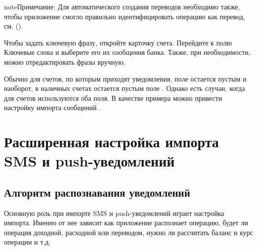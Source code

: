 \documentclass[a4paper,10pt,russian]{sphinxmanual}
\begin{document}
\begin{sphinxadmonition}{note}{Примечание:}
Для автоматического создания переводов необходимо также, чтобы приложение смогло правильно идентифицировать операцию как перевод, см. {\hyperref[\detokenize{notifications:chapter-notifications}]{}} ().
\end{sphinxadmonition}

Чтобы задать ключевую фразу, откройте карточку счета. Перейдите к полю Ключевые слова и выберите его их сообщения банка. Также, при необходимости, можно отредактировать фразы вручную.

\noindent{}
\noindent{}
\noindent{}

Обычно для счетов, по которым приходят уведомления, поле  остается пустым и наоборот, в наличных счетах
остается пустым поле . Однако есть случаи, когда для счетов используются оба поля. В качестве примера можно привести настройку
импорта сообщений .


\chapter{Расширенная настройка импорта SMS и push-уведомлений}
\label{\detokenize{notifications:sms-push}}\label{\detokenize{notifications:chapter-notifications}}\label{\detokenize{notifications::doc}}

\section{Алгоритм распознавания уведомлений}
\label{\detokenize{notifications:id1}}
Основную роль при импорте SMS и push-уведомлений играет настройка импорта. Именно от нее зависит
как приложение распознает операцию, будет ли операция доходной, расходной или переводом, нужно ли
рассчитать баланс и курс операции и т.д.
\end{document}
